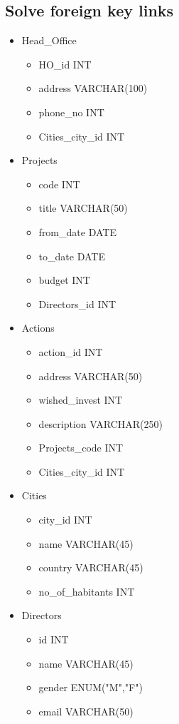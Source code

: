 \documentclass{article}
\begin{document}
\subsection{Solve foreign key links}
\begin{itemize}
	\item Head\_Office
	\begin{itemize}
		\item HO\_id INT
		\item address VARCHAR(100)
		\item phone\_no INT
		\item Cities\_city\_id INT
	\end{itemize}
	\item Projects
		\begin{itemize}
		\item code INT
		\item title VARCHAR(50)
		\item from\_date DATE
		\item to\_date DATE
		\item budget INT
		\item Directors\_id INT
	\end{itemize}
	\item Actions
		\begin{itemize}
		\item action\_id INT
		\item address VARCHAR(50)
		\item wished\_invest INT
		\item description VARCHAR(250)
		\item Projects\_code INT
		\item Cities\_city\_id INT
	\end{itemize}
	\item Cities
		\begin{itemize}
		\item city\_id INT
		\item name VARCHAR(45)
		\item country VARCHAR(45)
		\item no\_of\_habitants INT
	\end{itemize}
	\item Directors
		\begin{itemize}
		\item id INT
		\item name VARCHAR(45)
		\item gender ENUM("M","F")
		\item email VARCHAR(50)

\end{itemize}
\end{itemize}
\end{document}
